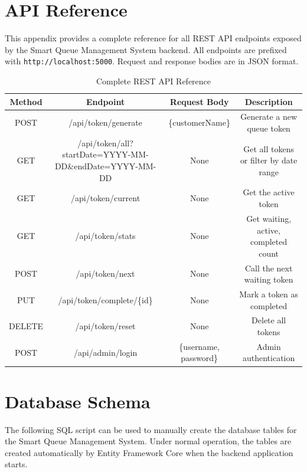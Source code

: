 
\appendix
\chapter{API Reference}

This appendix provides a complete reference for all REST API endpoints exposed by the Smart Queue Management System backend. All endpoints are prefixed with \texttt{http://localhost:5000}. Request and response bodies are in JSON format.

\begin{table}[htbp]
    \centering
    \begin{tabular}{|c|c|c|c|}
        \hline
        \textbf{Method} & \textbf{Endpoint} & \textbf{Request Body} & \textbf{Description} \\
        \hline
        POST & /api/token/generate & \{customerName\} & Generate a new queue token \\
        \hline
        GET & /api/token/all?startDate=YYYY-MM-DD\&endDate=YYYY-MM-DD & None & Get all tokens or filter by date range \\
        \hline
        GET & /api/token/current & None & Get the active token \\
        \hline
        GET & /api/token/stats & None & Get waiting, active, completed count \\
        \hline
        POST & /api/token/next & None & Call the next waiting token \\
        \hline
        PUT & /api/token/complete/\{id\} & None & Mark a token as completed \\
        \hline
        DELETE & /api/token/reset & None & Delete all tokens \\
        \hline
        POST & /api/admin/login & \{username, password\} & Admin authentication \\
        \hline
    \end{tabular}
    \caption{Complete REST API Reference}
    \label{tab:apiref}
\end{table}

\chapter{Database Schema}

The following SQL script can be used to manually create the database tables for the Smart Queue Management System. Under normal operation, the tables are created automatically by Entity Framework Core when the backend application starts.

